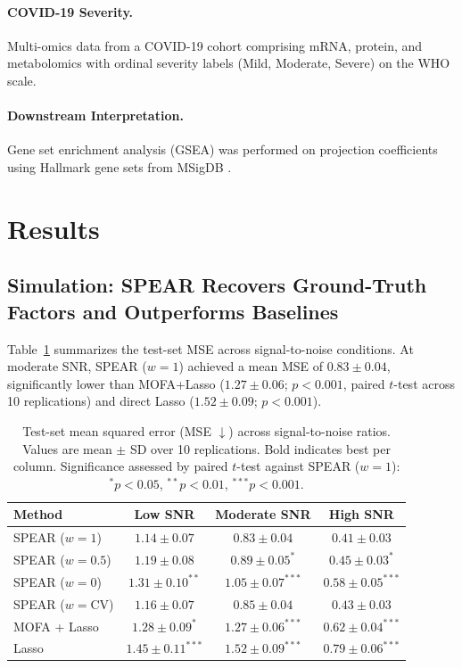\documentclass[11pt]{article}
\begin{document}
\paragraph{COVID-19 Severity.} Multi-omics data from a COVID-19 cohort \citep{overmyer2021large} comprising mRNA, protein, and metabolomics with ordinal severity labels (Mild, Moderate, Severe) on the WHO scale.

\paragraph{Downstream Interpretation.} Gene set enrichment analysis (GSEA) \citep{subramanian2005gene} was performed on projection coefficients using Hallmark gene sets from MSigDB \citep{liberzon2015molecular}.

\section{Results}

\subsection{Simulation: SPEAR Recovers Ground-Truth Factors and Outperforms Baselines}

Table~\ref{tab:sim_mse} summarizes the test-set MSE across signal-to-noise conditions. At moderate SNR, SPEAR ($w{=}1$) achieved a mean MSE of $0.83 \pm 0.04$, significantly lower than MOFA+Lasso ($1.27 \pm 0.06$; $p < 0.001$, paired $t$-test across 10 replications) and direct Lasso ($1.52 \pm 0.09$; $p < 0.001$).

\begin{table}[H]
\centering
\caption{Test-set mean squared error (MSE $\downarrow$) across signal-to-noise ratios. Values are mean $\pm$ SD over 10 replications. Bold indicates best per column. Significance assessed by paired $t$-test against SPEAR ($w{=}1$): $^*p<0.05$, $^{**}p<0.01$, $^{***}p<0.001$.}
\label{tab:sim_mse}
\begin{tabular}{lccc}
\toprule
Method & Low SNR & Moderate SNR & High SNR \\
\midrule
SPEAR ($w{=}1$) & $\mathbf{1.14 \pm 0.07}$ & $\mathbf{0.83 \pm 0.04}$ & $\mathbf{0.41 \pm 0.03}$ \\
SPEAR ($w{=}0.5$) & $1.19 \pm 0.08$ & $0.89 \pm 0.05^{*}$ & $0.45 \pm 0.03^{*}$ \\
SPEAR ($w{=}0$) & $1.31 \pm 0.10^{**}$ & $1.05 \pm 0.07^{***}$ & $0.58 \pm 0.05^{***}$ \\
SPEAR ($w{=}\text{CV}$) & $1.16 \pm 0.07$ & $0.85 \pm 0.04$ & $0.43 \pm 0.03$ \\
MOFA + Lasso & $1.28 \pm 0.09^{*}$ & $1.27 \pm 0.06^{***}$ & $0.62 \pm 0.04^{***}$ \\
Lasso & $1.45 \pm 0.11^{***}$ & $1.52 \pm 0.09^{***}$ & $0.79 \pm 0.06^{***}$ \\
\bottomrule
\end{tabular}
\end{table}
\end{document}
